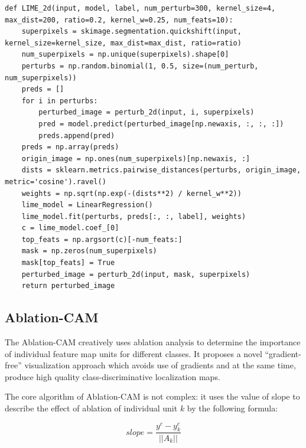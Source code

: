 \documentclass[conference]{IEEEtran}
\begin{document}
\begin{lstlisting}[title={LIME Algorithm Implementation},label={lime}]
def LIME_2d(input, model, label, num_perturb=300, kernel_size=4, max_dist=200, ratio=0.2, kernel_w=0.25, num_feats=10):
    superpixels = skimage.segmentation.quickshift(input, kernel_size=kernel_size, max_dist=max_dist, ratio=ratio)
    num_superpixels = np.unique(superpixels).shape[0]
    perturbs = np.random.binomial(1, 0.5, size=(num_perturb, num_superpixels))
    preds = []
    for i in perturbs:
        perturbed_image = perturb_2d(input, i, superpixels)
        pred = model.predict(perturbed_image[np.newaxis, :, :, :])
        preds.append(pred)
    preds = np.array(preds)
    origin_image = np.ones(num_superpixels)[np.newaxis, :]
    dists = sklearn.metrics.pairwise_distances(perturbs, origin_image, metric='cosine').ravel()
    weights = np.sqrt(np.exp(-(dists**2) / kernel_w**2))
    lime_model = LinearRegression()
    lime_model.fit(perturbs, preds[:, :, label], weights)
    c = lime_model.coef_[0]
    top_feats = np.argsort(c)[-num_feats:]
    mask = np.zeros(num_superpixels)
    mask[top_feats] = True
    perturbed_image = perturb_2d(input, mask, superpixels)
    return perturbed_image
\end{lstlisting}

\subsection{Ablation-CAM}

The Ablation-CAM creatively uses ablation analysis to determine the importance of individual feature map units for different classes. It proposes a novel “gradient-free” visualization approach which avoids use of gradients and at the same time, produce high quality class-discriminative localization maps.\par

The core algorithm of Ablation-CAM is not complex: it uses the value of slope to describe the effect of ablation of individual unit $k$ by the following formula:

$$slope = \frac{y^c-y^c_k}{||A_k||}$$
\end{document}
